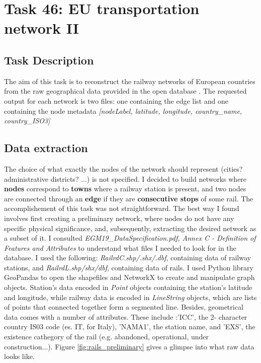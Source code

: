 \chapter{Task 46: EU transportation network II}
\section{Task Description}
The aim of this task is to reconstruct the railway networks of European countries from the raw geographical data provided in the open database
\parencite[][ \textit{EuroGlobalMap}, $2019$ release]{euroglobalmap}. The requested output for each network is two files: one containing the edge list and one containing the node metadata \textit{[nodeLabel, latitude, longitude, country\_name, country\_ISO3]}
\section{Data extraction}
The choice of what exactly the nodes of the network should represent (cities? administrative districts? ...) is not specified. 
I decided to build networks where \textbf{nodes} correspond to \textbf{towns} where a railway station is present, and two nodes are connected through an \textbf{edge}  if they are \textbf{consecutive stops} of some rail. The accomplishement of this task was not straightforward. The best way I found involves first creating a preliminary network, where nodes do not have any specific physical significance, and, subsequently, extracting the desired network as a subset of it. \newline \noindent
I consulted \textit{EGM19\_DataSpecification.pdf, 
 Annex C - Definition of Features and Attributes} to understand what files I needed to look for in the database. I used the following:
 \textit{RailrdC.shp/.shx/.dbf}, containing data of railway stations, and \textit{RailrdL.shp/shx/dbf}, containing data of rails. I used Python library GeoPandas to open the shapefiles and NetworkX to create and manipulate graph objects. Station's data encoded in \textit{Point} objects containing the station's latitude and longitude, while railway data is encoded in \textit{LineString} objects, which are lists of points that connected together form a segmented line.
Besides, geometrical data comes with a number of attributes. These include :'ICC', the 2- character country IS03 code (es. IT, for Italy),  'NAMA1', the station name, and 'EXS', the existence cathegory of the rail (e.g. abandoned, operational, under construction...). Figure \ref{fig:rails_preliminary} gives a glimpse into what raw data looks like. \medskip \newline \noindent

